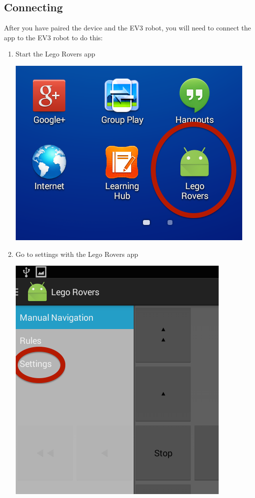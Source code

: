 \documentclass[]{article}   	%
\begin{document}
{\subsection{Connecting}
\par{After you have paired the device and the EV3 robot, you will need to connect the app to the EV3 robot to do this:
\begin{enumerate}
	\item Start the Lego Rovers app\\
		\begin{center}
			\includegraphics[scale=0.4]{apps.png}
		\end{center}		
\clearpage
	\item Go to settings with the Lego Rovers app\\
		\begin{center}
			\includegraphics[scale=0.4]{navset.png}

\end{center}
\end{enumerate}}}
\end{document}
